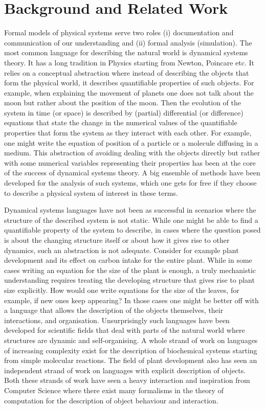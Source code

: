 \documentclass[phd]{infthesis}
\begin{document}
\chapter{Background and Related Work}
\label{chp:relWork}
Formal models of physical systems serve two roles (i) documentation and
communication of our understanding and (ii) formal analysis (simulation). The
most common language for describing the natural world is dynamical systems
theory. It has a long tradition in Physics starting from Newton, Poincare
etc. It relies on a conceptual abstraction where instead of describing the
objects that form the physical world, it describes quantifiable properties of
such objects. For example, when explaining the movement of planets one does not
talk about the moon but rather about the position of the moon. Then the
evolution of the system in time (or space) is described by (partial)
differential (or difference) equations that state the change in the numerical
values of the quantifiable properties that form the system as they interact with
each other. For example, one
might write the equation of position of a particle or a molecule diffusing in a
medium. This abstraction of avoiding dealing with the objects directly but
rather with some numerical variables representing their properties has been at
the core of the success of dynamical systems theory. A big ensemble of methods
have been developed for the analysis of such systems, which one gets for free if
they choose to describe a physical system of interest in these terms.

Dynamical systems languages have not been as successful in scenarios where the
structure of the  described system is not static. While one might be able to
find a quantifiable property of the system to describe, in cases where the
question posed is about the changing structure itself or about how it gives rise
to other dynamics, such an abstraction is not adequate. Consider for example
plant development and its effect on carbon intake for the entire
plant. While in some cases writing an equation for the size of the plant is
enough, a truly mechanistic understanding requires treating the developing structure that
gives rise to plant size explicitly. How would one write equations for the size
of the leaves, for example, if new ones keep appearing?
In those cases one might be better off with a language that allows the
description of the objects themselves, their interactions, and
organisation. Unsurprisingly such languages have been developed for
scientific fields that deal with parts of the natural world where structures are
dynamic and self-organising. A whole strand of work on languages of
increasing complexity exist for the description of biochemical systems starting
from simple molecular reactions. The field of plant development also has seen an
independent strand of work on languages with explicit description of objects.
Both these strands of work have seen a heavy interaction and inspiration 
from Computer Science where there exist many formalisms in the
theory of computation for the description of object behaviour and interaction.
\end{document}
